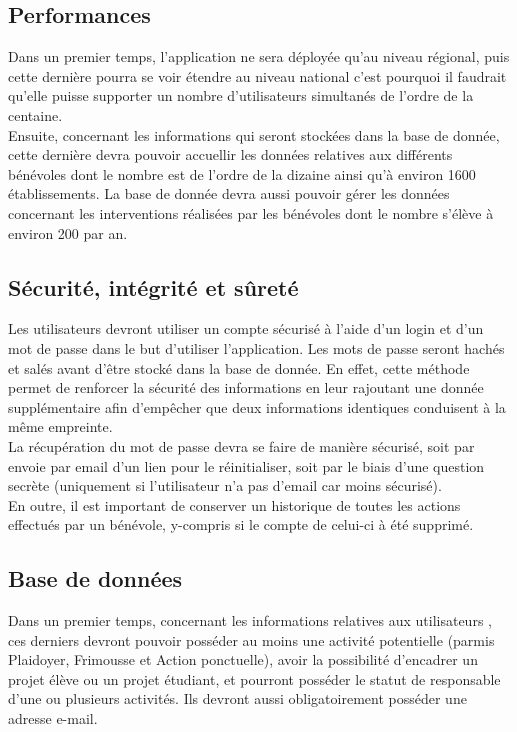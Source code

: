 \subsection{Performances}

Dans un premier temps, l'application ne sera déployée qu'au niveau régional, puis cette dernière pourra se voir étendre au niveau national c'est pourquoi il faudrait qu'elle puisse supporter un nombre d'utilisateurs simultanés de l'ordre de la centaine. \\

Ensuite, concernant les informations qui seront stockées dans la base de donnée, cette dernière devra pouvoir accuellir les données relatives aux différents bénévoles dont le nombre est de l'ordre de la dizaine ainsi qu'à environ 1600 établissements. La base de donnée devra aussi pouvoir gérer les données concernant les interventions réalisées par les bénévoles dont le nombre s'élève à environ 200 par an.

\subsection{Sécurité, intégrité et sûreté}

Les utilisateurs devront utiliser un compte sécurisé à l'aide d'un login et d'un mot de passe dans le but d'utiliser l'application. Les mots de passe seront hachés et salés avant d'être stocké dans la base de donnée. En effet, cette méthode permet de renforcer la sécurité des informations en leur rajoutant une donnée supplémentaire afin d'empêcher que deux informations identiques conduisent à la même empreinte. \\

 La récupération du mot de passe devra se faire de manière sécurisé, soit par envoie par email d'un lien pour le réinitialiser, soit par le biais d'une question secrète (uniquement si l'utilisateur n'a pas d'email car moins sécurisé).\\

En outre, il est important de conserver un historique de toutes les actions effectués par un bénévole, y-compris si le compte de celui-ci à été supprimé. 

\subsection{Base de données}

Dans un premier temps, concernant les informations relatives aux utilisateurs , ces derniers devront pouvoir posséder au moins une activité potentielle (parmis Plaidoyer, Frimousse et Action ponctuelle), avoir la possibilité d'encadrer un projet élève ou un projet étudiant, et pourront posséder le statut de responsable d'une ou plusieurs activités. Ils devront aussi obligatoirement posséder une adresse e-mail. \\

